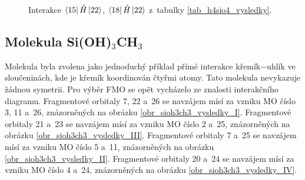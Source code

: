 \documentclass[
  printed, %
  table,   %
  lof,     %
  lot,     %
  oneside,
]{fithesis3}
\begin{document}
\begin{figure}
\begin{center}
\caption{Interakce $\bra{15}{\hat{H}}\ket{22}$, $\bra{18}{\hat{H}}\ket{22}$ z~tabulky \ref{tab_h4sio4_vysledky}.}
\label{obr_h4sio4_vysledky_III}
\end{center}
\end{figure} 
\subsection{Molekula Si(OH)$_3$CH$_3$}
Molekula  byla zvolena jako jednoduchý příklad přímé interakce křemík$-$uhlík ve sloučeninách, kde je křemík koordinován čtyřmi atomy. Tato molekula nevykazuje žádnou symetrii. Pro výběr FMO se opět vycházelo ze znalosti interakčního diagramu. 
Fragmentové orbitaly  7, 22 a~26 se navzájem mísí za vzniku MO číslo 3, 11 a~26, znázorněných na obrázku \ref{obr_sioh3ch3_vysledky_I}. Fragmentové orbitaly  21 a~23 se navzájem mísí za vzniku MO číslo 2 a~25, znázorněných na obrázku \ref{obr_sioh3ch3_vysledky_III}. 
Fragmentové orbitaly  7 a~25 se navzájem mísí za vzniku MO číslo 5 a~11, znázorněných na obrázku \ref{obr_sioh3ch3_vysledky_II}. Fragmentové orbitaly  20 a~24 se navzájem mísí za vzniku MO číslo 4 a~24, znázorněných na obrázku \ref{obr_sioh3ch3_vysledky_IV}.   
\end{document}
